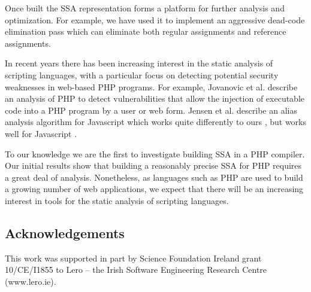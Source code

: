 Once built the SSA representation forms a platform for further
analysis and optimization. For example, we have used it to implement
an aggressive dead-code elimination pass which can eliminate both
regular assignments and reference assignments.

In recent years there has been increasing interest in the static
analysis of scripting languages, with a particular focus on detecting
potential security weaknesses in web-based PHP programs. For example,
Jovanovic et al. \cite{Jovanovic06pixy:a} describe an analysis of PHP
to detect vulnerabilities that allow the injection of executable code
into a PHP program by a user or web form. Jensen et al.  describe an
alias analysis algorithm for Javascript which works quite differently
to ours \cite{Biggar2010}, but works well for Javascript
\cite{Jensen+2009}.

To our knowledge we are the first to investigate building SSA in a PHP
compiler. Our initial results show that building a reasonably precise
SSA for PHP requires a great deal of analysis. Nonetheless, as
languages such as PHP are used to build a growing number of web
applications, we expect that there will be an increasing interest in
tools for the static analysis of scripting languages.

\subsection*{Acknowledgements}
This work was supported in part by Science Foundation Ireland
grant 10/CE/I1855 to Lero -- the Irish Software Engineering
Research Centre (www.lero.ie).



